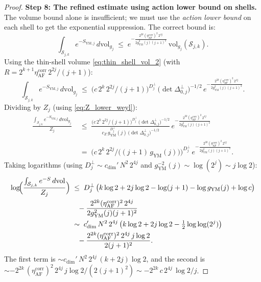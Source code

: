 \begin{proof}
\textbf{Step 8: The refined estimate using action lower bound on
shells.} The volume bound alone is insufficient; we must use the
\emph{action lower bound} on each shell to get the exponential
suppression. The correct bound is:
\begin{equation}
\label{eq:correct_shell_bound}
  \int_{\mathcal{S}_{j,k}}e^{-S_{\mathrm{YM},j}}\,d\mathrm{vol}_{
  g_{j}}
  \;\le\;e^{-\frac{2^{2k}(\eta_{\mathrm{AF}}^{\mathrm{corr}})^{2}
  \,2^{4j}}{2g_{\mathrm{YM}}^{2}(j)(j+1)^{2}}}\,
  \mathrm{vol}_{g_{j}}(\mathcal{S}_{j,k}).
\end{equation}
Using the thin-shell volume \eqref{eq:thin_shell_vol_2} (with
$R=2^{k+1}\eta_{\mathrm{AF}}^{\mathrm{corr}}\,2^{2j}/(j+1)$):
\begin{equation}
\label{eq:correct_shell_bound_2}
  \int_{\mathcal{S}_{j,k}}e^{-S_{\mathrm{YM},j}}\,d\mathrm{vol}_{
  g_{j}}
  \;\le\;\bigl(c\,2^{k}\,2^{2j}/(j+1)\bigr)^{D_{j}^{\perp}}\,
  \bigl(\det\Delta_{0,j}^{\perp}\bigr)^{-1/2}\,
  e^{-\frac{2^{2k}(\eta_{\mathrm{AF}}^{\mathrm{corr}})^{2}\,
  2^{4j}}{2g_{\mathrm{YM}}^{2}(j)(j+1)^{2}}}.
\end{equation}
Dividing by $Z_{j}$ (using \eqref{eq:Z_lower_weyl}):
\begin{align}
\label{eq:correct_ratio}
  \frac{\int_{\mathcal{S}_{j,k}}e^{-S_{\mathrm{YM},j}}\,d\mathrm{
  vol}_{g_{j}}}{Z_{j}}
  &\;\le\;\frac{\bigl(c\,2^{k}\,2^{2j}/(j+1)\bigr)^{D_{j}^{\perp}}\,
  \bigl(\det\Delta_{0,j}^{\perp}\bigr)^{-1/2}}{
  c_{Z}\,g_{\mathrm{YM}}^{D_{j}^{\perp}}(j)\,
  \bigl(\det\Delta_{0,j}^{\perp}\bigr)^{-1/2}}\,
  e^{-\frac{2^{2k}(\eta_{\mathrm{AF}}^{\mathrm{corr}})^{2}\,
  2^{4j}}{2g_{\mathrm{YM}}^{2}(j)(j+1)^{2}}}\\[4pt]
  &\;=\;\bigl(c\,2^{k}\,2^{2j}/\bigl((j+1)\,g_{\mathrm{YM}}(j)\bigr)
  \bigr)^{D_{j}^{\perp}}\,
  e^{-\frac{2^{2k}(\eta_{\mathrm{AF}}^{\mathrm{corr}})^{2}\,
  2^{4j}}{2g_{\mathrm{YM}}^{2}(j)(j+1)^{2}}}.
\end{align}
Taking logarithms (using $D_{j}^{\perp}\sim c_{\dim}'\,N^{2}\,2^{4j}$
and $g_{\mathrm{YM}}^{-2}(j)\sim\log(2^{j})\sim j\log 2$):
\begin{align}
\label{eq:log_ratio}
  \log\!\Bigl(\frac{\int_{\mathcal{S}_{j,k}}e^{-S}\,d\mathrm{vol}}{
  Z_{j}}\Bigr)
  &\;\le\;D_{j}^{\perp}\,\bigl(k\log 2+2j\log 2-\log(j+1)-
  \log g_{\mathrm{YM}}(j)+\log c\bigr)\\
  &\quad-\frac{2^{2k}(\eta_{\mathrm{AF}}^{\mathrm{corr}})^{2}\,
  2^{4j}}{2g_{\mathrm{YM}}^{2}(j)(j+1)^{2}}\\
  &\;\sim\;c_{\dim}'\,N^{2}\,2^{4j}\,\bigl(k\log 2+2j\log 2-
  \tfrac{1}{2}\log\log(2^{j})\bigr)\\
  &\quad-\frac{2^{2k}(\eta_{\mathrm{AF}}^{\mathrm{corr}})^{2}\,
  2^{4j}\,j\log 2}{2(j+1)^{2}}.
\end{align}
The first term is $\sim c_{\dim}'\,N^{2}\,2^{4j}\,(k+2j)\log 2$, and
the second is $\sim-2^{2k}\,(\eta_{\mathrm{AF}}^{\mathrm{corr}})^{2}\,
2^{4j}\,j\log 2/(2(j+1)^{2})\sim-2^{2k}\,c\,2^{4j}\,\log 2/j$.


\end{proof}
